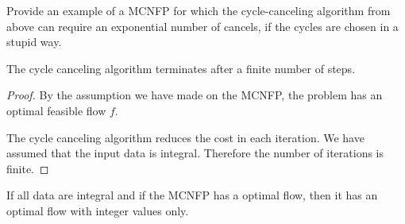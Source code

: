   \begin{exercise}
    Provide an example of a MCNFP for which the cycle-canceling
    algorithm from above can require an exponential number of
    cancels, if the cycles are chosen in a stupid way. 
  \end{exercise}


  \begin{theorem}
    \label{thr:12}
    The cycle canceling algorithm terminates after a finite number of
    steps. 
  \end{theorem}
  \begin{proof}   
  By the assumption we have made on the MCNFP, the problem has an
  optimal feasible flow $f$. 
  
  The cycle canceling algorithm reduces the cost in each iteration.
  We have assumed that the input data is integral.
  Therefore the number of iterations is finite.
  
  
  
\end{proof}


\begin{corollary}
  \label{co:3}
  If all data are integral and if the MCNFP has a optimal flow, then
  it has an optimal flow with integer values only. 
\end{corollary}




    





